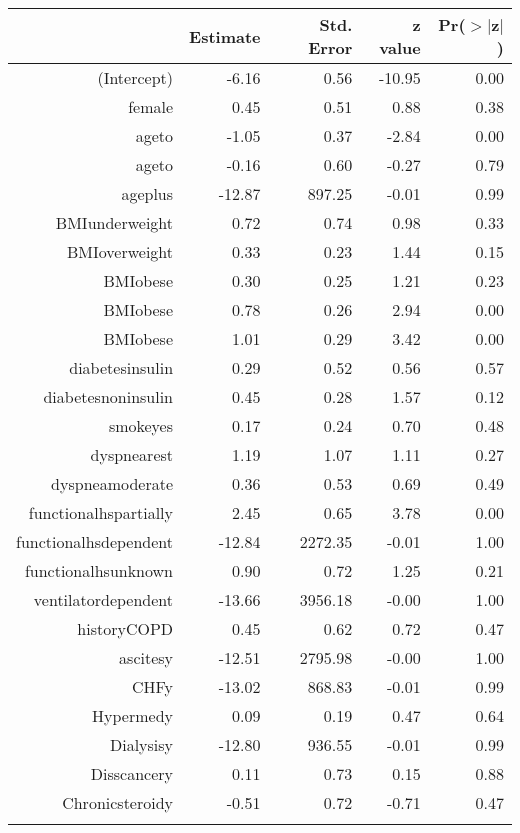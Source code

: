 \bigskip\bigskip
\centering
\begin{tabular}{rrrrr}
  \hline
 & Estimate & Std. Error & z value & Pr($>$$|$z$|$) \\ 
  \hline
(Intercept) & -6.16 & 0.56 & -10.95 & 0.00 \\ 
  female & 0.45 & 0.51 & 0.88 & 0.38 \\ 
  age\-65\-to\-74 & -1.05 & 0.37 & -2.84 & 0.00 \\ 
  age\-75\-to\-84 & -0.16 & 0.60 & -0.27 & 0.79 \\ 
  age\-85\-plus & -12.87 & 897.25 & -0.01 & 0.99 \\ 
  BMI\-underweight & 0.72 & 0.74 & 0.98 & 0.33 \\ 
  BMI\-overweight & 0.33 & 0.23 & 1.44 & 0.15 \\ 
  BMI\-obese\-1 & 0.30 & 0.25 & 1.21 & 0.23 \\ 
  BMI\-obese\-2 & 0.78 & 0.26 & 2.94 & 0.00 \\ 
  BMI\-obese\-3 & 1.01 & 0.29 & 3.42 & 0.00 \\ 
  diabetes\-insulin & 0.29 & 0.52 & 0.56 & 0.57 \\ 
  diabetes\-noninsulin & 0.45 & 0.28 & 1.57 & 0.12 \\ 
  smoke\-yes & 0.17 & 0.24 & 0.70 & 0.48 \\ 
  dyspnea\-rest & 1.19 & 1.07 & 1.11 & 0.27 \\ 
  dyspnea\-moderate & 0.36 & 0.53 & 0.69 & 0.49 \\ 
  functional\-hs\-partially & 2.45 & 0.65 & 3.78 & 0.00 \\ 
  functional\-hs\-dependent & -12.84 & 2272.35 & -0.01 & 1.00 \\ 
  functional\-hs\-unknown & 0.90 & 0.72 & 1.25 & 0.21 \\ 
  ventilator\-dependent & -13.66 & 3956.18 & -0.00 & 1.00 \\ 
  history\-COPD & 0.45 & 0.62 & 0.72 & 0.47 \\ 
  ascites\-y & -12.51 & 2795.98 & -0.00 & 1.00 \\ 
  CHF\-y & -13.02 & 868.83 & -0.01 & 0.99 \\ 
  Hyper\-med\-y & 0.09 & 0.19 & 0.47 & 0.64 \\ 
  Dialysis\-y & -12.80 & 936.55 & -0.01 & 0.99 \\ 
  Diss\-cancer\-y & 0.11 & 0.73 & 0.15 & 0.88 \\ 
  Chronic\-steroid\-y & -0.51 & 0.72 & -0.71 & 0.47 \\ 
$$
\end{tabular}
